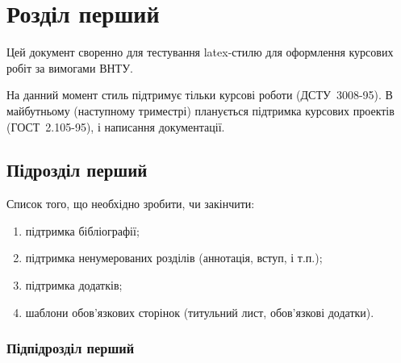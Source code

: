 
\section{Розділ перший}
Цей документ своренно для тестування latex-стилю\cite{companion} для оформлення курсових робіт
за вимогами ВНТУ.

На данний момент стиль підтримує тільки курсові роботи (ДСТУ~3008-95). В
майбутньому (наступному триместрі) планується підтримка курсових проектів
(ГОСТ~2.105-95), і написання документації.
\subsection{Підрозділ перший}
Список того, що необхідно зробити, чи закінчити:
\begin{enumerate}
	\item підтримка бібліографії;
	\item підтримка ненумерованих розділів (аннотація, вступ, і т.п.);
	\item підтримка додатків;
	\item шаблони обов'язкових сторінок (титульний лист, обов'язкові додатки).
\end{enumerate}

\subsubsection{Підпідрозділ перший}


